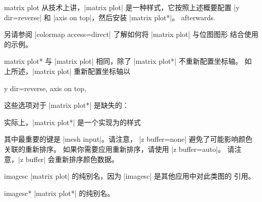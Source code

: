 {\begin{plottype}[/pgfplots]{matrix plot}
        从技术上讲，|matrix plot| 是一种样式，它按照上述概要配置 |y dir=reverse| 和
        |axis on top|，然后安装 |matrix plot*|。
    afterwards.

        另请参阅 |colormap access=direct| 了解如何将 |matrix plot| 与位图图形
        结合使用的示例。
\end{plottype}

\begin{plottype}{matrix plot*}
    与 |matrix plot| 相同，除了 |matrix plot*| 不重新配置坐标轴。
    如上所述，|matrix plot| 重新配置坐标轴以
\begin{codeexample}
y dir=reverse,
axis on top,
\end{codeexample}

    这些选项对于 |matrix plot*| 是缺失的：
\begin{codeexample}[]
\end{codeexample}
    实际上，|matrix plot*| 是一个实现为的样式
\begin{codeexample}
\end{codeexample}
        其中最重要的键是 |mesh input|。请注意，
        |z buffer=none| 避免了可能影响颜色关联的重新排序。
        如果你需要应用重新排序，请使用 |z buffer=auto|。
        请注意，|z buffer| 会重新排序颜色数据。
\end{plottype}

\begin{plottype}{imagesc}
    |matrix plot| 的纯别名，因为 |imagesc| 是其他应用中对此类图的
    引用。
\end{plottype}

\begin{plottype}{imagesc*}
    |matrix plot*| 的纯别名。
\end{plottype}


}
